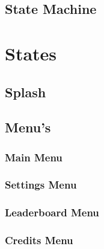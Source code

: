 \documentclass{report}
\begin{document}

  \section{State Machine} %
  \label{sec:state_machine}


\chapter{States} %
\label{cha:states}

  \section{Splash} %
  \label{sec:splash}


  \section{Menu's} %
  \label{sec:menu_s}

    \subsection{Main Menu} %
    \label{sub:main_menu}


    \subsection{Settings Menu} %
    \label{sub:settings_menu}


    \subsection{Leaderboard Menu} %
    \label{sub:leaderboard_menu}


    \subsection{Credits Menu} %
    \label{sub:credits_menu}

\end{document}
